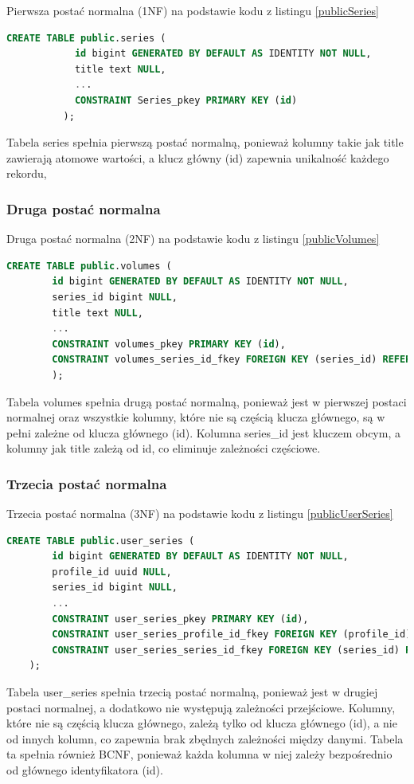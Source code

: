 \documentclass[12pt,twoside]{article}
\begin{document}
Pierwsza postać normalna (1NF) na podstawie kodu z listingu \ref{publicSeries}
\begin{lstlisting}[language=SQL,caption=kod tworzenia tabeli series, label={publicSeries}]
		CREATE TABLE public.series (
			id bigint GENERATED BY DEFAULT AS IDENTITY NOT NULL,
			title text NULL,
			...
			CONSTRAINT Series_pkey PRIMARY KEY (id)
		  );
\end{lstlisting}
Tabela series spełnia pierwszą postać normalną, ponieważ kolumny takie jak title zawierają atomowe 
wartości, a klucz główny (id) zapewnia unikalność każdego rekordu,

\subsubsection{Druga postać normalna}
Druga postać normalna (2NF) na podstawie kodu z listingu \ref{publicVolumes}
\begin{lstlisting}[language=SQL,caption=kod tworzenia tabeli volumes, label={publicVolumes}]
	CREATE TABLE public.volumes (
		id bigint GENERATED BY DEFAULT AS IDENTITY NOT NULL,
		series_id bigint NULL,
		title text NULL,
		...
		CONSTRAINT volumes_pkey PRIMARY KEY (id),
		CONSTRAINT volumes_series_id_fkey FOREIGN KEY (series_id) REFERENCES series(id)
		);
\end{lstlisting}
Tabela volumes spełnia drugą postać normalną, ponieważ jest w pierwszej postaci normalnej oraz 
wszystkie kolumny, które nie są częścią klucza głównego, są w pełni zależne od klucza głównego (id). 
Kolumna series\_id jest kluczem obcym, a kolumny jak title zależą od id, co eliminuje zależności 
częściowe.

\subsubsection{Trzecia postać normalna}

Trzecia postać normalna (3NF) na podstawie kodu z listingu \ref{publicUserSeries}
\begin{lstlisting}[language=SQL,caption=kod tworzenia tabeli user\_series, label={publicUserSeries}]
	CREATE TABLE public.user_series (
		id bigint GENERATED BY DEFAULT AS IDENTITY NOT NULL,
		profile_id uuid NULL,
		series_id bigint NULL,
		...
		CONSTRAINT user_series_pkey PRIMARY KEY (id),
		CONSTRAINT user_series_profile_id_fkey FOREIGN KEY (profile_id) REFERENCES profiles(id),
		CONSTRAINT user_series_series_id_fkey FOREIGN KEY (series_id) REFERENCES series(id)
	);
\end{lstlisting}
Tabela user\_series spełnia trzecią postać normalną, ponieważ jest w drugiej postaci normalnej, a 
dodatkowo nie występują zależności przejściowe. Kolumny, które nie są częścią klucza głównego, zależą 
tylko od klucza głównego (id), a nie od innych kolumn, co zapewnia brak zbędnych zależności między danymi.
Tabela ta spełnia również BCNF, ponieważ każda kolumna w niej zależy bezpośrednio od głównego identyfikatora 
(id).
\end{document}
